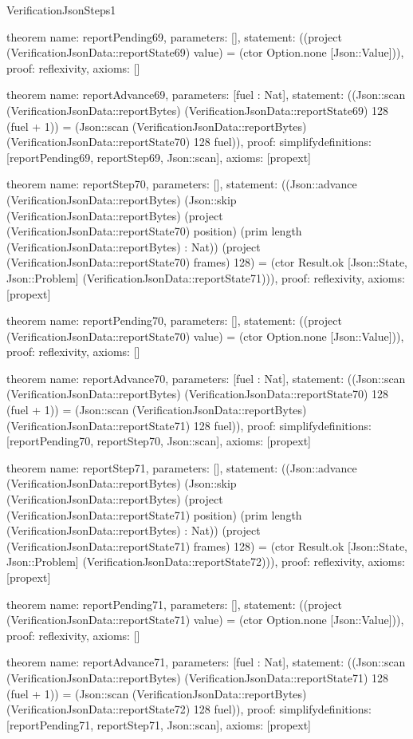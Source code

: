 \begin{lexlean}{VerificationJsonSteps1}
\begin{semanticmodule}
theorem{
  name: reportPending69,
  parameters: [],
  statement: ((project (VerificationJsonData::reportState69) value) = (ctor Option.none [Json::Value])),
  proof: reflexivity{},
  axioms: []
}

theorem{
  name: reportAdvance69,
  parameters: [fuel : Nat],
  statement: ((Json::scan (VerificationJsonData::reportBytes) (VerificationJsonData::reportState69) 128 (fuel + 1)) = (Json::scan (VerificationJsonData::reportBytes) (VerificationJsonData::reportState70) 128 fuel)),
  proof: simplify{definitions: [reportPending69, reportStep69, Json::scan]},
  axioms: [propext]
}

theorem{
  name: reportStep70,
  parameters: [],
  statement: ((Json::advance (VerificationJsonData::reportBytes) (Json::skip (VerificationJsonData::reportBytes) (project (VerificationJsonData::reportState70) position) (prim length (VerificationJsonData::reportBytes) : Nat)) (project (VerificationJsonData::reportState70) frames) 128) = (ctor Result.ok [Json::State, Json::Problem] (VerificationJsonData::reportState71))),
  proof: reflexivity{},
  axioms: [propext]
}

theorem{
  name: reportPending70,
  parameters: [],
  statement: ((project (VerificationJsonData::reportState70) value) = (ctor Option.none [Json::Value])),
  proof: reflexivity{},
  axioms: []
}

theorem{
  name: reportAdvance70,
  parameters: [fuel : Nat],
  statement: ((Json::scan (VerificationJsonData::reportBytes) (VerificationJsonData::reportState70) 128 (fuel + 1)) = (Json::scan (VerificationJsonData::reportBytes) (VerificationJsonData::reportState71) 128 fuel)),
  proof: simplify{definitions: [reportPending70, reportStep70, Json::scan]},
  axioms: [propext]
}

theorem{
  name: reportStep71,
  parameters: [],
  statement: ((Json::advance (VerificationJsonData::reportBytes) (Json::skip (VerificationJsonData::reportBytes) (project (VerificationJsonData::reportState71) position) (prim length (VerificationJsonData::reportBytes) : Nat)) (project (VerificationJsonData::reportState71) frames) 128) = (ctor Result.ok [Json::State, Json::Problem] (VerificationJsonData::reportState72))),
  proof: reflexivity{},
  axioms: [propext]
}

theorem{
  name: reportPending71,
  parameters: [],
  statement: ((project (VerificationJsonData::reportState71) value) = (ctor Option.none [Json::Value])),
  proof: reflexivity{},
  axioms: []
}

theorem{
  name: reportAdvance71,
  parameters: [fuel : Nat],
  statement: ((Json::scan (VerificationJsonData::reportBytes) (VerificationJsonData::reportState71) 128 (fuel + 1)) = (Json::scan (VerificationJsonData::reportBytes) (VerificationJsonData::reportState72) 128 fuel)),
  proof: simplify{definitions: [reportPending71, reportStep71, Json::scan]},
  axioms: [propext]
}


\end{semanticmodule}
\end{lexlean}
